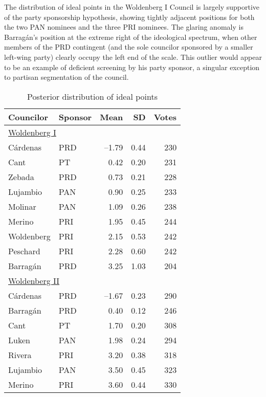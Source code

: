 \documentclass[12 pt, letter]{article}
\begin{document}
The distribution of ideal points in the Woldenberg I Council is largely supportive of the party sponsorship hypothesis, showing tightly adjacent positions for both the two PAN nominees and the three PRI nominees.  The glaring anomaly is Barrag\'an's position at the extreme right of the ideological spectrum, when other members of the PRD contingent (and the sole councilor sponsored by a smaller left-wing party) clearly occupy the left end of the scale.  This outlier would appear to be an example of deficient screening by his party sponsor, a singular exception to partisan segmentation of the council.

\begin{table}
\caption{Posterior distribution of ideal points}\label{T:idealpoints}
\begin{center}
\begin{tabular}{llrrr}
\hline
 Councilor   &  Sponsor  &    Mean    & SD & Votes\\ \hline
\multicolumn{5}{l}{\underline{Woldenberg I}}   \\ [1.5ex]
C\'ardenas        & PRD &--1.79  &   0.44 & 230\\
Cant              & PT  &  0.42  &   0.20 & 231\\
Zebada            & PRD &  0.73  &   0.21 & 228\\
Lujambio          & PAN &  0.90  &   0.25 & 233\\
Molinar           & PAN &  1.09  &   0.26 & 238\\
Merino            & PRI &  1.95  &   0.45 & 244\\
Woldenberg        & PRI &  2.15  &   0.53 & 242\\
Peschard          & PRI &  2.28  &   0.60 & 242\\
Barrag\'an        & PRD &  3.25  &   1.03 & 204\\ [1ex]
\multicolumn{5}{l}{\underline{Woldenberg II}}  \\ [1.5ex]
C\'ardenas        & PRD &--1.67  &   0.23 & 290\\
Barrag\'an        & PRD &  0.40  &   0.12 & 246\\
Cant              & PT  &  1.70  &   0.20 & 308\\
Luken             & PAN &  1.98  &   0.24 & 294\\
Rivera            & PRI &  3.20  &   0.38 & 318\\
Lujambio          & PAN &  3.50  &   0.45 & 323\\
Merino            & PRI &  3.60  &   0.44 & 330\\

\end{tabular}
\end{center}
\end{table}
\end{document}
